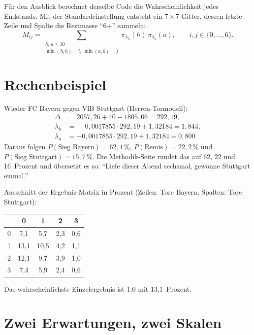 Für den Ausblick berechnet derselbe Code die Wahrscheinlichkeit jedes
Endstands. Mit der Standardeinstellung  entsteht ein
$7 \times 7$-Gitter, dessen letzte Zeile und Spalte die Restmasse
\enquote{6+} sammeln:
\begin{equation}
  M_{ij} = \sum_{\substack{h,\,a \le 30\\ \min(h,6) = i,\ \min(a,6) = j}}
           \pi_{\lambda_h}(h)\,\pi_{\lambda_a}(a), \qquad i, j \in \{0, \dots, 6\}.
\end{equation}

\section{Rechenbeispiel}\label{sec:tor-beispiel}

Wieder FC Bayern gegen VfB Stuttgart (Herren-Tormodell):
\begin{align*}
  \Delta &= 2057{,}26 + 40 - 1805{,}06 = 292{,}19,\\
  \lambda_h &= \phantom{-}0{,}0017855 \cdot 292{,}19 + 1{,}32184 = 1{,}844,\\
  \lambda_a &= -0{,}0017855 \cdot 292{,}19 + 1{,}32184 = 0{,}800.
\end{align*}
Daraus folgen $P(\text{Sieg Bayern}) = 62{,}1\,\%$,
$P(\text{Remis}) = 22{,}2\,\%$ und
$P(\text{Sieg Stuttgart}) = 15{,}7\,\%$. Die Methodik-Seite rundet das auf
62, 22 und 16~Prozent und übersetzt es so: \enquote{Liefe dieser Abend
sechsmal, gewönne Stuttgart einmal.}

Ausschnitt der Ergebnis-Matrix in Prozent (Zeilen: Tore Bayern, Spalten:
Tore Stuttgart):

\begin{center}
\begin{tabular}{@{}c|cccc@{}}
     & 0 & 1 & 2 & 3 \\ \midrule
0    & 7{,}1  & 5{,}7  & 2{,}3 & 0{,}6 \\
1    & 13{,}1 & 10{,}5 & 4{,}2 & 1{,}1 \\
2    & 12{,}1 & 9{,}7  & 3{,}9 & 1{,}0 \\
3    & 7{,}4  & 5{,}9  & 2{,}4 & 0{,}6 \\
\end{tabular}
\end{center}
Das wahrscheinlichste Einzelergebnis ist 1:0 mit 13{,}1~Prozent.

\section{Zwei Erwartungen, zwei Skalen}\label{sec:skalen}

